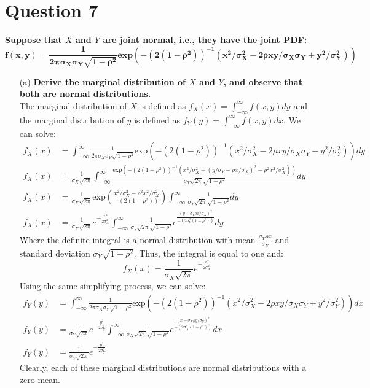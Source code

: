 \documentclass{article}
\newcommand{\intinf}{\int_{-\infty}^{\infty}}
\begin{document}
\section*{Question 7}
\textbf{Suppose that $X$ and $Y$ are joint normal, i.e., they have the joint PDF:}
\[
	\mathbf{f(x,y) = \frac{1}{2\pi\sigma_X\sigma_Y\sqrt{1-\rho^2}}\text{exp}(-(2(1-\rho^2))^{-1}(x^2/\sigma^2_X-2\rho xy/\sigma_X\sigma_Y + y^2/\sigma_Y^2))}
\]
\begin{itemize}
	\item[(a)] \textbf{Derive the marginal distribution of $X$ and $Y$, and observe that both are normal distributions.}
		\bigskip \\
		The marginal distribution of $X$ is defined as $f_X(x) = \intinf f(x,y)dy$ and the marginal distribution of $y$ is defined as $f_Y(y)=\intinf f(x,y)dx$. We can solve:
		\begin{align*}
			f_X(x) &= \intinf\frac{1}{2\pi\sigma_X\sigma_Y\sqrt{1-\rho^2}}\text{exp}(-(2(1-\rho^2))^{-1}(x^2/\sigma^2_X-2\rho xy/\sigma_X\sigma_Y + y^2/\sigma_Y^2)) dy \\
			f_X(x) &= \frac{1}{\sigma_X\sqrt{2\pi}}\intinf \frac{\text{exp}(-(2(1-\rho^2))^{-1}(x^2/\sigma^2_X+(y/\sigma_Y - \rho x/\sigma_X)^2-\rho^2x^2/\sigma^2_X))}{\sigma_Y\sqrt{2\pi}\sqrt{1-\rho^2}} dy \\
			f_X(x) &= \frac{1}{\sigma_X\sqrt{2\pi}} \text{exp}\left(\frac{x^2/\sigma^2_X-\rho^2x^2/\sigma^2_X}{-(2(1-\rho^2))}\right)
			\intinf \frac{1}{\sigma_Y\sqrt{2\pi}\sqrt{1-\rho^2}}  dy	\\
			f_X(x) &= \frac{1}{\sigma_X\sqrt{2\pi}} e^{-\frac{x^2}{2\sigma^2_X}}
			\intinf \frac{1}{\sigma_Y\sqrt{2\pi}\sqrt{1-\rho^2}} e^{\frac{(y - \sigma_Y\rho x/\sigma_X)^2}{-(2\sigma_Y^2(1-\rho^2))}} dy
		\end{align*}
		Where the definite integral is a normal distribution with mean $\frac{\sigma_Y\rho x}{\sigma_X}$ and standard deviation $\sigma_Y\sqrt{1-\rho^2}$. Thus, the integral is equal to one and:
		\[
			f_X(x) = \frac{1}{\sigma_X\sqrt{2\pi}} e^{-\frac{x^2}{2\sigma^2_X}}
		\]
		Using the same simplifying process, we can solve:
		\begin{align*}
			f_Y(y) &= \intinf\frac{1}{2\pi\sigma_X\sigma_Y\sqrt{1-\rho^2}}\text{exp}(-(2(1-\rho^2))^{-1}(x^2/\sigma^2_X-2\rho xy/\sigma_X\sigma_Y + y^2/\sigma_Y^2)) dx \\
			f_Y(y) &= \frac{1}{\sigma_Y\sqrt{2\pi}} e^{-\frac{y^2}{2\sigma^2_Y}}
			\intinf \frac{1}{\sigma_X\sqrt{2\pi}\sqrt{1-\rho^2}} e^{\frac{(x - \sigma_X\rho y/\sigma_Y)^2}{-(2\sigma_X^2(1-\rho^2))}} dx \\
			f_Y(y) &= \frac{1}{\sigma_Y\sqrt{2\pi}} e^{-\frac{y^2}{2\sigma^2_Y}}
		\end{align*}
		Clearly, each of these marginal distributions are normal distributions with a zero mean.


\end{itemize}
\end{document}
